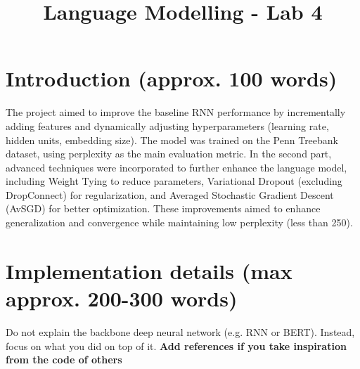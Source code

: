 \documentclass[a4paper]{article}
\title{Language Modelling - Lab 4}
\begin{document}
\maketitle
%
%
\section{Introduction (approx. 100 words)}
The project aimed to improve the baseline RNN performance by incrementally adding 
features and dynamically adjusting hyperparameters (learning rate, hidden units,
embedding size). The model was trained on the Penn Treebank dataset, using perplexity
as the main evaluation metric. In the second part, advanced techniques \cite{merityRegOpt} were 
incorporated to further enhance the language model, including Weight Tying 
to reduce parameters, Variational Dropout (excluding DropConnect) for 
regularization, and Averaged Stochastic Gradient Descent (AvSGD) for better
optimization. These improvements aimed to enhance generalization and 
convergence while maintaining low perplexity (less than 250). 

\section{Implementation details (max approx. 200-300 words)}
Do not explain the backbone deep neural network (e.g. RNN or BERT). Instead, focus on what you did on top of it. \textbf{Add references if you take inspiration from the code of others}
\end{document}
